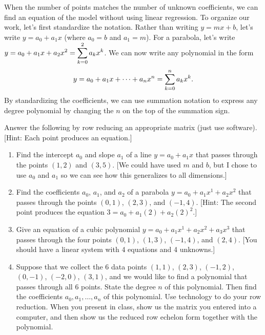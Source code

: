 When the number of points matches the number of unknown coefficients, we can find an equation of the model without using linear regression. To organize our work, let's first standardize the notation.  Rather than writing $y=mx+b$, let's write $y=a_0+a_1 x$ (where $a_0=b$ and $a_1=m$). For a parabola, let's write $\displaystyle y=a_0 + a_1 x+ a_2 x^2 = \sum_{k=0}^{2} a_k x^k$. We can now write any polynomial in the form $$\displaystyle y = a_0 + a_1 x+ \cdots + a_n x^n = \sum_{k=0}^n a_k x^k.$$ By standardizing the coefficients, we can use summation notation to express any degree polynomial by changing the $n$ on the top of the summation sign. 

\begin{problem}
 Answer the following by row reducing an appropriate matrix (just use software). [Hint: Each point produces an equation.]
\begin{enumerate}
 \item 
Find the intercept $a_0$ and slope $a_1$ of a line $y = a_0+a_1 x$ that passes through the points $(1,2)$ and $(3,5)$. [We could have used $m$ and $b$, but I chose to use $a_0$ and $a_1$ so we can see how this generalizes to all dimensions.]
 \item 
Find the coefficients $a_0$, $a_1$, and $a_2$ of a parabola $y = a_0+a_1 x^1+a_2x^2$ that passes through the points $(0, 1)$,  $(2, 3)$, and  $(−1, 4)$. [Hint: The second point produces the equation $3=a_0+a_1(2)+a_2(2)^2$.]
 \item
Give an equation of a cubic polynomial $y = a_0+a_1x^1+a_2x^2+a_3x^3$ that passes through the four points $(0, 1)$, $(1, 3)$, $(−1, 4)$, and $(2, 4)$. [You should have a linear system with 4 equations and 4 unknowns.]
\item 
Suppose that we collect the 6 data points $(1,1)$, $(2,3)$, $(-1,2)$, $(0,-1)$, $(-2,0)$, $(3,1)$, and we would like to find a polynomial that passes through all 6 points. State the degree $n$ of this polynomial. Then find the coefficients $a_0, a_1, \ldots, a_n$ of this polynomial. Use technology to do your row reduction.  When you present in class, show us the matrix you entered into a computer, and then show us the reduced row echelon form together with the polynomial.
\end{enumerate}
\end{problem}













